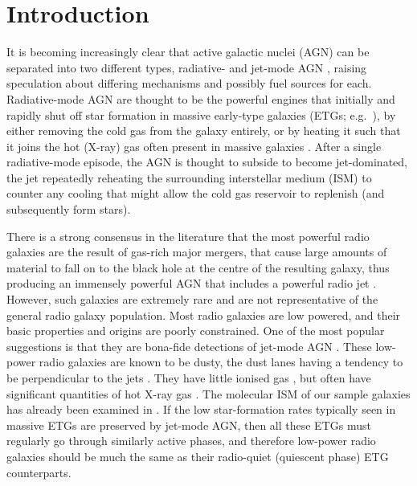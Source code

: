 \documentclass[a4paper,fleqn,usenatbib]{mnras}
\begin{document}


\section{Introduction}
\label{sec:intro}

It is becoming increasingly clear that active galactic nuclei (AGN)
can be separated into two different types, radiative- and jet-mode AGN
\citep[e.g.][]{Antonucci2012, Heckman2014}, raising speculation about
differing mechanisms and possibly fuel sources for
each. Radiative-mode AGN are thought to be the powerful engines that
initially and rapidly shut off star formation in massive early-type
galaxies (ETGs; e.g.\ \citealt{Thomas2005, Thomas2010}), by either
removing the cold gas from the galaxy entirely, or by heating it such
that it joins the hot (X-ray) gas often present in massive galaxies
\citep[e.g.][]{OSullivan2001}.
After a single radiative-mode episode, the AGN is thought to subside
to become jet-dominated, the jet repeatedly reheating the surrounding
interstellar medium (ISM) to counter any cooling that might allow the
cold gas reservoir to replenish (and subsequently form stars).

There is a strong consensus in the literature that the most powerful
radio galaxies are the result of gas-rich major mergers, that cause
large amounts of material to fall on to the black hole at the centre
of the resulting galaxy, thus producing an immensely powerful AGN that
includes a powerful radio jet \citep[e.g.][]{Malin1983, Quillen1992,
  Lim2000}. However, such galaxies are extremely rare and are not
representative of the general radio galaxy population. Most radio
galaxies are low powered, and their basic properties and origins are
poorly constrained. One of the most popular suggestions is that they
are bona-fide detections of jet-mode AGN \citep[e.g.][]{Heckman2014}.
These low-power radio galaxies are known to be dusty, the dust lanes
having a tendency to be perpendicular to the jets
\citep[e.g.][]{DeRuiter2002, VerdoesKleijn2005}. They have little
ionised gas \citep[e.g.][]{Sarzi2005}, but often have significant
quantities of hot X-ray gas \citep[e.g.][]{Canizares1987}. The
molecular ISM of our sample galaxies has already been examined in
\citet{ruffa2019, ruffa2020}. If the low star-formation rates
typically seen in massive ETGs are preserved by jet-mode AGN, then all
these ETGs must regularly go through similarly active phases, and
therefore low-power radio galaxies should be much the same as their
radio-quiet (quiescent phase) ETG counterparts.
\end{document}
